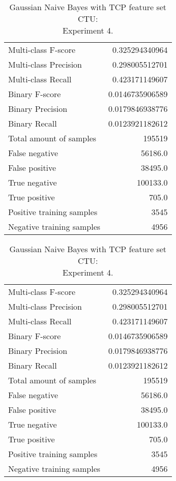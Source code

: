 \begin{table}[H]
\begin{minipage}{0.5\textwidth}
\caption{Gaussian Naive Bayes with TCP feature set CTU: \\Experiment 3.}
\centering
\begin{tabular}{l r}
\toprule
Multi-class F-score & 0.325294340964 \\
Multi-class Precision & 0.298005512701 \\
Multi-class Recall & 0.423171149607 \\
\midrule
Binary F-score & 0.0146735906589 \\
Binary Precision & 0.0179846938776 \\
Binary Recall & 0.0123921182612 \\
\midrule
Total amount of samples & 195519 \\
False negative & 56186.0 \\
False positive & 38495.0 \\
True negative & 100133.0 \\
True positive & 705.0 \\
\midrule
Positive training samples & 3545 \\
Negative training samples & 4956 \\
\bottomrule
\end{tabular}
\end{minipage}
\hfillx
\begin{minipage}{0.5\textwidth}
\caption{Gaussian Naive Bayes with TCP feature set CTU: \\Experiment 4.}
\centering
\begin{tabular}{l r}
\toprule
Multi-class F-score & 0.325294340964 \\
Multi-class Precision & 0.298005512701 \\
Multi-class Recall & 0.423171149607 \\
\midrule
Binary F-score & 0.0146735906589 \\
Binary Precision & 0.0179846938776 \\
Binary Recall & 0.0123921182612 \\
\midrule
Total amount of samples & 195519 \\
False negative & 56186.0 \\
False positive & 38495.0 \\
True negative & 100133.0 \\
True positive & 705.0 \\
\midrule
Positive training samples & 3545 \\
Negative training samples & 4956 \\
\bottomrule
\end{tabular}
\end{minipage}
\end{table}
